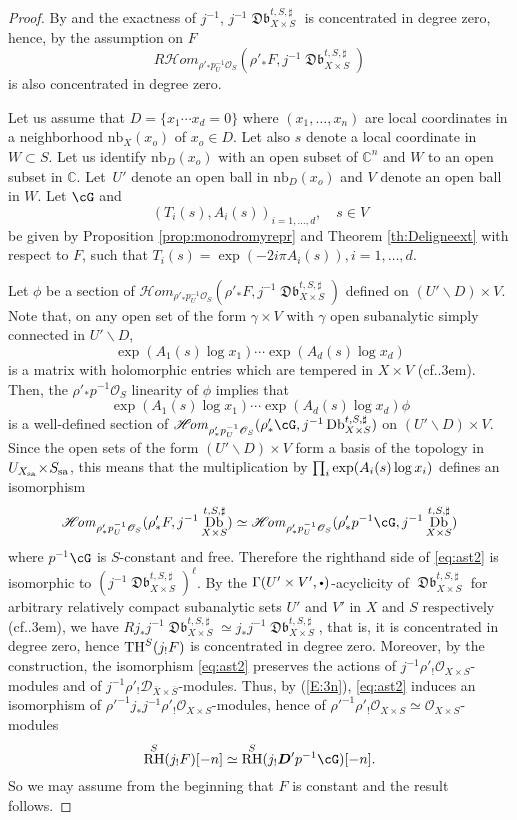 \documentclass[english]{smfart}
\numberwithin{subsection}{section}
\def\shd{\mathcal{D}}\let\cD\shd
\def\sho{\mathcal{O}}\let\cO\sho
\newcommand{\C}{\mathbb{C}}\let\CC\C
\newcommand{\bD}{\boldsymbol{D}}
\newcommand{\shhom}{\mathcal{H}\!\mathit{om}}\let\ho\shhom
\DeclareMathOperator{\RH}{RH}
\newcommand{\nb}{\mathrm{nb}}
\newcommand{\sa}{\mathrm{sa}}
\newcommand{\XS}{X\times S}
\DeclareMathOperator{\Db}{\mathfrak{Db}}
\let\setminus\smallsetminus
\def\cf{cf.\kern.3em}
\newcommand{\cbbullet}{{\raisebox{1pt}{$\sbullet$}}}
\newcommand{\sbullet}{{\scriptscriptstyle\bullet}}
\numberwithin{equation}{section}
\theoremstyle{plain}
\theoremstyle{definition}
\let\oldprod\prod
\renewcommand{\prod}{\mathop{\textstyle\oldprod}\displaylimits}
\begin{document}
\begin{proof}
By \cite[Prop.\,5.2(i)]{MF-P14} and the exactness of $j^{-1}$, $j^{-1}\Db^{t,S,\sharp}_{\XS}$ is concentrated in degree zero, hence, by the assumption on $F$
$$R\shhom_{\rho'_*p_{U}^{-1}\sho_S}(\rho'_*F, j^{-1}\Db^{t, S,\sharp}_{\XS})$$ is also concentrated in degree zero.

Let us assume that $D=\{x_1\cdots x_d=0\}$ where $(x_1,\dots,x_n)$ are local coordinates in a neighborhood $\nb_X(x_o)$ of $x_o\in D$. Let also $s$ denote a local coordinate in $W\subset S$. Let us identify $\nb_D(x_o)$ with an open subset of $\C^n$ and $W$ to an open subset in $\C$. Let~$U'$ denote an open ball in $\nb_D(x_o)$ and $V$ denote an open ball in $W$. Let $\cG$ and $$(T_i(s), A_i(s))_{i=1,\dots,d},\quad s\in V$$ be given by Proposition \ref{prop:monodromyrepr} and Theorem \ref{th:Deligneext} with respect to $F$, such that $T_i(s)=\exp(-2i\pi A_i(s)), i=1,\dots, d$.

Let $\phi$ be a section of $\shhom_{\rho'_*p_{U}^{-1}\sho_S}(\rho'_*F, j^{-1}\Db^{t, S,\sharp}_{\XS})$ defined on $(U'\setminus D)\times V$. Note that, on any open set of the form $\gamma\times V$ with $\gamma$ open subanalytic simply connected in $U'\setminus D$, $$\exp(A_1(s)\log x_1)\cdots\exp(A_{d}(s)\log x_d)$$ is a matrix with holomorphic entries which are tempered in $X\times V$ (\cf \cite[Ex.\,5.1]{MF-P14}).
Then, the $\rho'_*p^ {-1}\sho_S$ linearity of $\phi$ implies that $$\exp(A_1(s)\log x_1)\cdots\exp(A_{d}(s)\log x_d)\phi$$ is a well-defined section of $\shhom_{\rho'_*p_{U}^{-1}\sho_S}(\rho'_*\cG, j^{-1}\Db^{t, S,\sharp}_{\XS})$ on $(U'\setminus D)\times V$. Since the open sets of the form $(U'\setminus D)\!\times\!V$ form a basis of the topology in $U_{X_{\sa}}\!\times \nobreak\!\nobreak S_{\sa}$, this means that the multiplication by $\prod_i\exp(A_i(s)\log x_i)$ defines an isomorphism
\begin{equation}\label{eq:ast2}
\shhom_{\rho'_*p_{U}^{-1}\sho_S}(\rho'_*F, j^{-1}\Db^{t, S,\sharp}_{\XS})\simeq \shhom_{\rho'_*p_{U}^{-1}\sho_S}(\rho'_*p^{-1}\cG, j^{-1}\Db^{t, S,\sharp}_{\XS})
\end{equation}
where $p^{-1}$$\cG$ is $S$-constant and free. Therefore the righthand side of \eqref{eq:ast2} is isomorphic to $({j^{-1}\Db_{\XS}^{t,S,\sharp}})^\ell$. By the $\Gamma(U'\times V',\cbbullet)$-acyclicity of $\Db_{\XS}^{t,S,\sharp}$ for arbitrary relatively compact subanalytic sets $U'$ and $V'$ in $X$ and $S$ respectively (\cf \cite[Prop.\,5.2(i)]{MF-P14}), we have $Rj_*j^{-1}\Db_{\XS}^{t,S,\sharp}\simeq j_*j^{-1}\Db_{\XS}^{t,S,\sharp}$, that is, it is concentrated in degree zero, hence $\operatorname{TH}^{S}(j_!F)$ is concentrated in degree zero. Moreover, by the construction, the isomorphism \eqref{eq:ast2} preserves the actions of $j^{-1}\rho'_!\sho_{\XS}$-modules and of $j^{-1}\rho'_!\shd_{\overline{X}\times \overline{S}}$-modules. Thus, by (\ref{E:3n}), \eqref{eq:ast2} induces an isomorphism of $\rho'^{-1}j_*j^{-1}\rho'_!\sho_{\XS}$-modules, hence of $\rho'^{-1}\rho'_!\sho_{\XS}\simeq\sho_{\XS}$-modules $$\RH^S(j_!F)[-n]\simeq \RH^S(j_!\bD'p^{-1}\cG)[-n].$$ So we may assume from the beginning that $F$ is constant and the result follows.
\end{proof}
\end{document}
